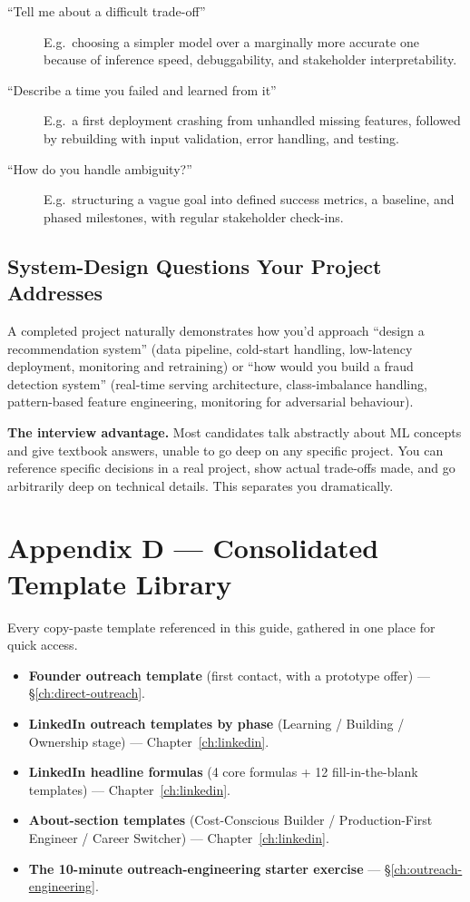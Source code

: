 \begin{description}
  \item[``Tell me about a difficult trade-off''] E.g.\ choosing a simpler model over a marginally more accurate
  one because of inference speed, debuggability, and stakeholder interpretability.
  \item[``Describe a time you failed and learned from it''] E.g.\ a first deployment crashing from unhandled
  missing features, followed by rebuilding with input validation, error handling, and testing.
  \item[``How do you handle ambiguity?''] E.g.\ structuring a vague goal into defined success metrics, a
  baseline, and phased milestones, with regular stakeholder check-ins.
\end{description}

\subsection{System-Design Questions Your Project Addresses}

A completed project naturally demonstrates how you'd approach ``design a recommendation system'' (data pipeline,
cold-start handling, low-latency deployment, monitoring and retraining) or ``how would you build a fraud
detection system'' (real-time serving architecture, class-imbalance handling, pattern-based feature engineering,
monitoring for adversarial behaviour).

\begin{keytakeaway}
\textbf{The interview advantage.} Most candidates talk abstractly about ML concepts and give textbook answers,
unable to go deep on any specific project. You can reference specific decisions in a real project, show actual
trade-offs made, and go arbitrarily deep on technical details. This separates you dramatically.
\end{keytakeaway}

\section{Appendix D --- Consolidated Template Library}
\label{app:template-library}

Every copy-paste template referenced in this guide, gathered in one place for quick access.

\begin{itemize}
  \item \textbf{Founder outreach template} (first contact, with a prototype offer) --- \S\ref{ch:direct-outreach}.
  \item \textbf{LinkedIn outreach templates by phase} (Learning / Building / Ownership stage) ---
  Chapter~\ref{ch:linkedin}.
  \item \textbf{LinkedIn headline formulas} (4 core formulas + 12 fill-in-the-blank templates) ---
  Chapter~\ref{ch:linkedin}.
  \item \textbf{About-section templates} (Cost-Conscious Builder / Production-First Engineer / Career Switcher)
  --- Chapter~\ref{ch:linkedin}.
  \item \textbf{The 10-minute outreach-engineering starter exercise} --- \S\ref{ch:outreach-engineering}.
\end{itemize}

